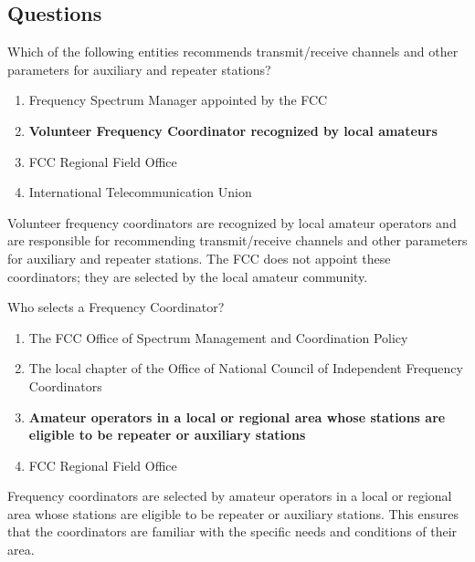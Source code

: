 \subsection*{Questions}
\begin{tcolorbox}[colback=gray!10!white,colframe=black!75!black,title={T1A08}]
    Which of the following entities recommends transmit/receive channels and other parameters for auxiliary and repeater stations?
    \begin{enumerate}[label=\Alph*),noitemsep]
        \item Frequency Spectrum Manager appointed by the FCC
        \item \textbf{Volunteer Frequency Coordinator recognized by local amateurs}
        \item FCC Regional Field Office
        \item International Telecommunication Union
    \end{enumerate}
\end{tcolorbox}
Volunteer frequency coordinators are recognized by local amateur operators and are responsible for recommending transmit/receive channels and other parameters for auxiliary and repeater stations. The FCC does not appoint these coordinators; they are selected by the local amateur community.


\begin{tcolorbox}[colback=gray!10!white,colframe=black!75!black,title={T1A09}]
    Who selects a Frequency Coordinator?
    \begin{enumerate}[label=\Alph*),noitemsep]
        \item The FCC Office of Spectrum Management and Coordination Policy
        \item The local chapter of the Office of National Council of Independent Frequency Coordinators
        \item \textbf{Amateur operators in a local or regional area whose stations are eligible to be repeater or auxiliary stations}
        \item FCC Regional Field Office
    \end{enumerate}
\end{tcolorbox}
Frequency coordinators are selected by amateur operators in a local or regional area whose stations are eligible to be repeater or auxiliary stations. This ensures that the coordinators are familiar with the specific needs and conditions of their area.


